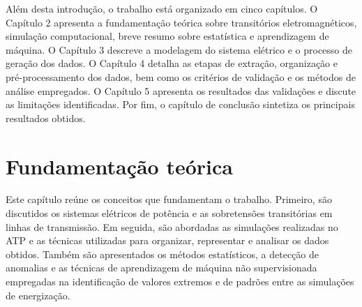 \documentclass[
	12pt,				%
	openright,			%
	oneside,			%
	a4paper,			%
	chapter=TITLE,		%
	section=TITLE,		%
	subsection=TITLE,	%
	subsubsection=TITLE,%
	english,			%
	brazilian			%
	]{abntex2}
\theoremstyle{definition}
\begin{document}
Além desta introdução, o trabalho está organizado em cinco capítulos. O Capítulo 2 apresenta a fundamentação teórica sobre transitórios eletromagnéticos, simulação computacional, breve resumo sobre estatística e aprendizagem de máquina. O Capítulo 3 descreve a modelagem do sistema elétrico e o processo de geração dos dados. O Capítulo 4 detalha as etapas de extração, organização e pré-processamento dos dados, bem como os critérios de validação e os métodos de análise empregados. O Capítulo 5 apresenta os resultados das validações e discute as limitações identificadas. Por fim, o capítulo de conclusão sintetiza os principais resultados obtidos.

\chapter{Fundamentação teórica}


Este capítulo reúne os conceitos que fundamentam o trabalho. Primeiro, são discutidos os sistemas elétricos de potência e as sobretensões transitórias em linhas de transmissão. Em seguida, são abordadas as simulações realizadas no ATP e as técnicas utilizadas para organizar, representar e analisar os dados obtidos. Também são apresentados os métodos estatísticos, a detecção de anomalias e as técnicas de aprendizagem de máquina não supervisionada empregadas na identificação de valores extremos e de padrões entre as simulações de energização.
\end{document}
